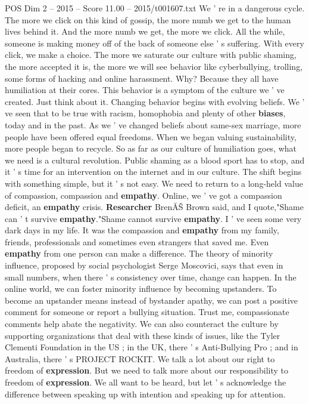 \begin{textsample}{POS Dim 2 – 2015 – Score 11.00 – 2015/t001607.txt}
We ' re in a dangerous cycle.
The more we click on this kind of gossip, the more numb we get to the human lives behind it.
And the more numb we get, the more we click.
All the while, someone is making money off of the back of someone else ' s suffering.
With every click, we make a choice.
The more we saturate our culture with public shaming, the more accepted it is, the more we will see behavior like cyberbullying, trolling, some forms of hacking and online harassment.
Why?
Because they all have humiliation at their cores.
This behavior is a symptom of the culture we ' ve created.
Just think about it.
Changing behavior begins with evolving beliefs.
We ' ve seen that to be true with racism, homophobia and plenty of other \textbf{biases}, today and in the past.
As we ' ve changed beliefs about same-sex marriage, more people have been offered equal freedoms.
When we began valuing sustainability, more people began to recycle.
So as far as our culture of humiliation goes, what we need is a cultural revolution.
Public shaming as a blood sport has to stop, and it ' s time for an intervention on the internet and in our culture.
The shift begins with something simple, but it ' s not easy.
We need to return to a long-held value of compassion, compassion and \textbf{empathy}.
Online, we ' ve got a compassion deficit, an \textbf{empathy} crisis. \textbf{Researcher} BrenĂŠ Brown said, and I quote,"Shame can ' t survive \textbf{empathy}."Shame cannot survive \textbf{empathy}.
I ' ve seen some very dark days in my life.
It was the compassion and \textbf{empathy} from my family, friends, professionals and sometimes even strangers that saved me.
Even \textbf{empathy} from one person can make a difference.
The theory of minority influence, proposed by social psychologist Serge Moscovici, says that even in small numbers, when there ' s consistency over time, change can happen.
In the online world, we can foster minority influence by becoming upstanders.
To become an upstander means instead of bystander apathy, we can post a positive comment for someone or report a bullying situation.
Trust me, compassionate comments help abate the negativity.
We can also counteract the culture by supporting organizations that deal with these kinds of issues, like the Tyler Clementi Foundation in the US ; in the UK, there ' s Anti-Bullying Pro ; and in Australia, there ' s PROJECT ROCKIT.
We talk a lot about our right to freedom of \textbf{expression}.
But we need to talk more about our responsibility to freedom of \textbf{expression}.
We all want to be heard, but let ' s acknowledge the difference between speaking up with intention and speaking up for attention.

\end{textsample}
